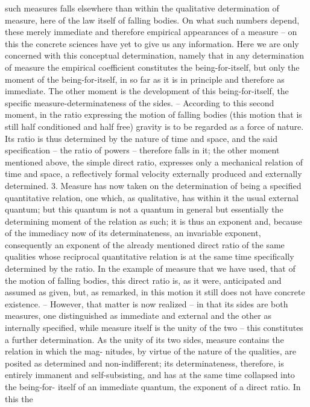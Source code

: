such measures falls elsewhere than within the qualitative determination of
measure, here of the law itself of falling bodies. On what such numbers
depend, these merely immediate and therefore empirical appearances of a
measure – on this the concrete sciences have yet to give us any information.
Here we are only concerned with this conceptual determination, namely
that in any determination of measure the empirical coefficient constitutes
the being-for-itself, but only the moment of the being-for-itself, in so far
as it is in principle and therefore as immediate. The other moment is the
development of this being-for-itself, the specific measure-determinateness
of the sides. – According to this second moment, in the ratio expressing
the motion of falling bodies (this motion that is still half conditioned and
half free) gravity is to be regarded as a force of nature. Its ratio is thus
determined by the nature of time and space, and the said specification –
the ratio of powers – therefore falls in it; the other moment mentioned
above, the simple direct ratio, expresses only a mechanical relation of time
and space, a reflectively formal velocity externally produced and externally
determined.
3. Measure has now taken on the determination of being a specified
quantitative relation, one which, as qualitative, has within it the usual
external quantum; but this quantum is not a quantum in general but
essentially the determining moment of the relation as such; it is thus an
exponent and, because of the immediacy now of its determinateness, an
invariable exponent, consequently an exponent of the already mentioned
direct ratio of the same qualities whose reciprocal quantitative relation is
at the same time specifically determined by the ratio. In the example of
measure that we have used, that of the motion of falling bodies, this direct
ratio is, as it were, anticipated and assumed as given, but, as remarked, in
this motion it still does not have concrete existence. – However, that matter
is now realized – in that its sides are both measures, one distinguished as
immediate and external and the other as internally specified, while measure
itself is the unity of the two – this constitutes a further determination. As
the unity of its two sides, measure contains the relation in which the mag-
nitudes, by virtue of the nature of the qualities, are posited as determined
and non-indifferent; its determinateness, therefore, is entirely immanent
and self-subsisting, and has at the same time collapsed into the being-for-
itself of an immediate quantum, the exponent of a direct ratio. In this the
